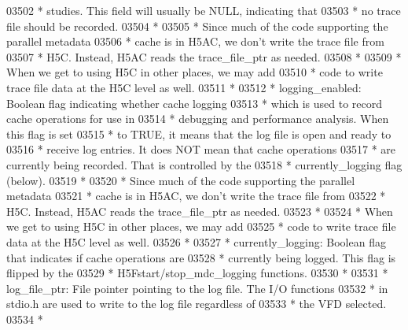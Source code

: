 \begin{DoxyCode}
03502 \textcolor{comment}{ *              studies.  This field will usually be NULL, indicating that}
03503 \textcolor{comment}{ *              no trace file should be recorded.}
03504 \textcolor{comment}{ *}
03505 \textcolor{comment}{ *              Since much of the code supporting the parallel metadata}
03506 \textcolor{comment}{ *              cache is in H5AC, we don't write the trace file from}
03507 \textcolor{comment}{ *              H5C.  Instead, H5AC reads the trace\_file\_ptr as needed.}
03508 \textcolor{comment}{ *}
03509 \textcolor{comment}{ *              When we get to using H5C in other places, we may add}
03510 \textcolor{comment}{ *              code to write trace file data at the H5C level as well.}
03511 \textcolor{comment}{ *}
03512 \textcolor{comment}{ * logging\_enabled: Boolean flag indicating whether cache logging}
03513 \textcolor{comment}{ *              which is used to record cache operations for use in}
03514 \textcolor{comment}{ *              debugging and performance analysis. When this flag is set}
03515 \textcolor{comment}{ *              to TRUE, it means that the log file is open and ready to}
03516 \textcolor{comment}{ *              receive log entries. It does NOT mean that cache operations}
03517 \textcolor{comment}{ *              are currently being recorded. That is controlled by the}
03518 \textcolor{comment}{ *              currently\_logging flag (below).}
03519 \textcolor{comment}{ *}
03520 \textcolor{comment}{ *              Since much of the code supporting the parallel metadata}
03521 \textcolor{comment}{ *              cache is in H5AC, we don't write the trace file from}
03522 \textcolor{comment}{ *              H5C.  Instead, H5AC reads the trace\_file\_ptr as needed.}
03523 \textcolor{comment}{ *}
03524 \textcolor{comment}{ *              When we get to using H5C in other places, we may add}
03525 \textcolor{comment}{ *              code to write trace file data at the H5C level as well.}
03526 \textcolor{comment}{ *}
03527 \textcolor{comment}{ * currently\_logging: Boolean flag that indicates if cache operations are}
03528 \textcolor{comment}{ *              currently being logged. This flag is flipped by the}
03529 \textcolor{comment}{ *              H5Fstart/stop\_mdc\_logging functions.}
03530 \textcolor{comment}{ *}
03531 \textcolor{comment}{ * log\_file\_ptr:  File pointer pointing to the log file. The I/O functions}
03532 \textcolor{comment}{ *              in stdio.h are used to write to the log file regardless of}
03533 \textcolor{comment}{ *              the VFD selected.}
03534 \textcolor{comment}{ *}

\end{DoxyCode}
